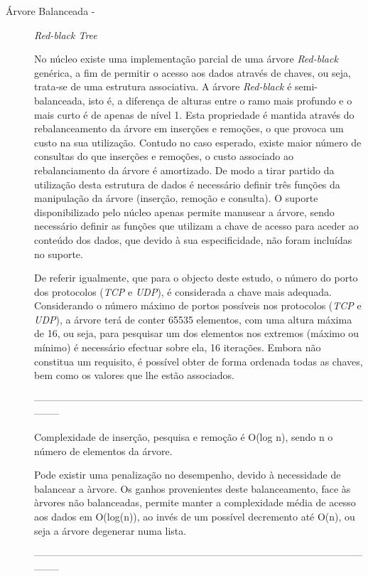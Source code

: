 \begin{description}

\item[Árvore Balanceada - ] \textit{Red-black Tree} 

No núcleo existe uma implementação parcial de uma árvore \textit{Red-black} genérica, a fim de permitir o acesso aos dados através de chaves, ou seja, trata-se de uma estrutura associativa.%
A árvore \textit{Red-black} é semi-balanceada, isto é, a diferença de alturas entre o ramo mais profundo e o mais curto é de apenas de nível 1.
Esta propriedade é mantida através do rebalanceamento da árvore em inserções e remoções, o que provoca um custo na sua utilização.
Contudo no caso esperado, existe maior número de consultas do que inserções e remoções, o custo associado ao rebalanciamento da árvore é amortizado.
De modo a tirar partido da utilização desta estrutura de dados é necessário definir três funções da manipulação da árvore (inserção, remoção e consulta).
O suporte disponibilizado pelo núcleo apenas permite manusear a árvore, sendo necessário definir as funções que utilizam a chave de acesso para aceder ao conteúdo dos dados, que devido à sua especificidade, não foram incluídas no suporte.

De referir igualmente, que para o objecto deste estudo, o número do porto dos protocolos (\textit{TCP} e \textit{UDP}), é considerada a chave mais adequada.
Considerando o número máximo de portos possíveis nos protocolos (\textit{TCP} e \textit{UDP}), a árvore terá de conter 65535 elementos, com uma altura máxima de 16, ou seja, para pesquisar um dos elementos nos extremos (máximo ou mínimo) é necessário efectuar sobre ela, 16 iterações.
Embora não constitua um requisito, é possível obter de forma ordenada todas as chaves, bem como os valores que lhe estão associados.

-----------------------------------------------------------------------------------------------------------

Complexidade de inserção, pesquisa e remoção é O(log n), sendo n o número de elementos da árvore.

Pode existir uma penalização no desempenho, devido à necessidade de balancear a àrvore.
Os ganhos provenientes deste balanceamento, face às àrvores não balanceadas, permite manter a complexidade média de acesso aos dados em O(log(n)), ao invés de um possível decremento até O(n), ou seja a árvore degenerar numa lista.

-----------------------------------------------------------------------------------------------------------


\end{description}


